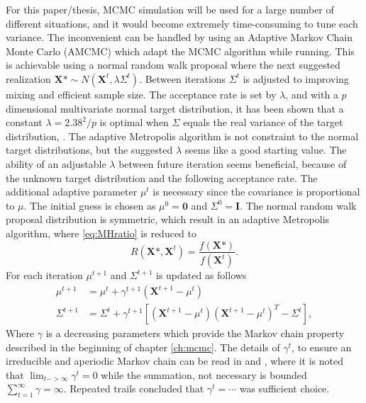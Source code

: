 For this paper/thesis, MCMC simulation will be used for a large number of different situations, and it would become extremely time-consuming to tune each variance. 
The inconvenient can be handled by using an Adaptive Markov Chain Monte Carlo (AMCMC) which adapt the MCMC algorithm while running. This is achievable using a normal random walk proposal where the next suggested realization $ \boldsymbol{X}\mbox{*} \sim N ( \boldsymbol{X}^{t}, \lambda \Sigma^{t})$. 
Between iterations $\Sigma^t$ is adjusted to improving mixing and efficient sample size. The acceptance rate is set by $\lambda$, and with a $p$ dimensional multivariate normal target distribution, it has been shown that a constant $\lambda=2.38^2/p$ is optimal when $\Sigma$ equals the real variance of the target distribution, \cite{AccRate}. The adaptive Metropolis algorithm is not constraint to the normal target distributions, but the suggested $\lambda$ seems like a good starting value. The ability of an adjustable $\lambda$ between future iteration seems beneficial, because of the unknown target distribution and the following acceptance rate.
The additional adaptive parameter $\mu^t$ is necessary since the covariance is proportional to $\mu$. The initial guess is chosen as $\mu^0=\boldsymbol{0}$ and $\Sigma^0=\mathbf{I}$.
The normal random walk proposal distribution is symmetric, which result in an adaptive Metropolis algorithm, where \eqref{eq:MHratio} is reduced to
\begin{equation}
\label{eq:metropolis}
R(\boldsymbol{X} \mbox{*},\boldsymbol{X}^{t})=\frac{f(\boldsymbol{X} \mbox{*})}{f(\boldsymbol{X}^{t})}.
\end{equation}
For each iteration $\mu^{t+1}$ and $\Sigma^{t+1}$ is updated as follows
\begin{align}
\mu^{t+1}&=\mu^{t}+\gamma^{t+1}(\boldsymbol{X}^{t+1}-\mu^t)\\
\Sigma^{t+1}&=\Sigma^{t}+\gamma^{t+1}\left[(\boldsymbol{X}^{t+1}-\mu^t)(\boldsymbol{X}^{t+1}-\mu^t)^{T}-\Sigma^{t}\right],
\end{align}
Where $\gamma$ is a decreasing parameters which provide the Markov chain property described in the beginning of chapter \ref{ch:mcmc}. The details of $\gamma^t$, to ensure an irreducible and aperiodic Markov chain can be read in \cite{compstat550} 
and \cite{compstat16}
, where it is noted that $\lim_{t->\infty} \gamma^{t}=0$ while the summation, not necessary is bounded $ \sum_{t=1}^{\infty} \gamma=\infty $. 
Repeated trails concluded that $\gamma^t=\cdots$ was sufficient choice. %

